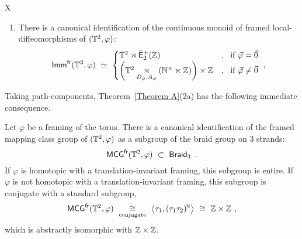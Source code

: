 \begin{mythm}{X}
\begin{enumerate}
\begin{enumerate}
\item
There is a canonical identification of the continuous monoid of framed local-diffeomorphisms of $(\mathbb T^2,\varphi)$:
\[
\operatorname{\sf Imm}^{\operatorname{\sf fr}}(\mathbb T^2,\varphi)
~\simeq~
\begin{cases}
\mathbb T^2 \rtimes \operatorname{\widetilde{\sf E}_{2}^{+}(\mathbb Z)}
&
,~
\text{ if } \vec{\varphi} = \vec{0}
\\
\left( \mathbb T^2 \underset{D_{\vec{\varphi}} , A_{\vec{\varphi}}} \rtimes (\mathbb N^\times \ltimes \mathbb Z ) \right) \times \mathbb Z
&
,~
\text{ if } \vec{\varphi} \neq \vec{0}
\end{cases}
~,
\]


\end{enumerate}





\end{enumerate}



\end{mythm}





Taking path-components, Theorem~\ref{Theorem A}(2a) has the following immediate consequence.
\begin{cor}
\label{t38}
Let $\varphi$ be a framing of the torus.
There is a canonical identification of the framed mapping class group of $(\mathbb T^2,\varphi)$ as a subgroup of the braid group on 3 strands:
\[
{\sf MCG}^{\operatorname{\sf fr}}(\mathbb T^2,\varphi)
~\subset~
\operatorname{{\sf Braid}_3}
~.
\]
If $\varphi$ is homotopic with a translation-invariant framing, this subgroup is entire.
If $\varphi$ is not homotopic with a translation-invariant framing, this subgroup is conjugate with a standard subgroup,
\[
{\sf MCG}^{\operatorname{\sf fr}}(\mathbb T^2,\varphi)
~\underset{\rm conjugate}\cong~
\bigl\langle \tau_1 , (\tau_1 \tau_2)^6 \bigr\rangle
~\cong~
\mathbb Z \times \mathbb Z
~,
\]
which is abstractly isomorphic with $\mathbb Z\times \mathbb Z$.

\end{cor}



